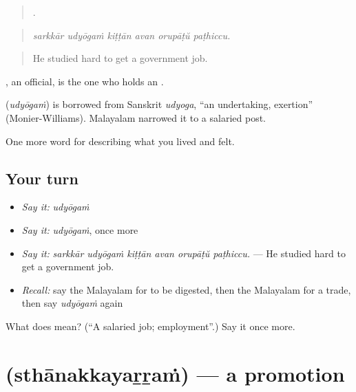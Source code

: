 \begin{quote}
     .
\end{quote}

\begin{quote}
\emph{sarkkār udyōgaṁ kiṭṭān avan orupāṭŭ paṭhiccu.}
\end{quote}

\begin{quote}
He studied hard to get a government job.
\end{quote}

, an official, is the one who holds an .

\begin{cousinweb}
\textbf{} (\emph{udyōgaṁ}) is borrowed from Sanskrit \emph{udyoga}, \textquotedblleft{}an undertaking, exertion\textquotedblright{} (Monier-Williams). Malayalam narrowed it to a salaried post.
\end{cousinweb}

\begin{grammarlens}[title={What you've built}]
One more word for describing what you lived and felt.
\end{grammarlens}

\subsection*{Your turn}
\begin{itemize}
\raggedright
  \item \emph{Say it:} \emph{udyōgaṁ}
  \item \emph{Say it:} \emph{udyōgaṁ}, once more
  \item \emph{Say it:} \emph{sarkkār udyōgaṁ kiṭṭān avan orupāṭŭ paṭhiccu.} — He studied hard to get a government job.
  \item \emph{Recall:} say the Malayalam for to be digested, then the Malayalam for a trade, then say \emph{udyōgaṁ} again
\end{itemize}

\begin{tcolorbox}[breakable,colback=teal!4,colframe=teal!35!black,title={Before you move on}]
What does  mean? (\textquotedblleft{}A salaried job; employment\textquotedblright{}.) Say it once more.
\end{tcolorbox}
\section[\texorpdfstring{\ml{സ്ഥാനക്കയറ്റം} (sthānakkayaṟṟaṁ)}{സ്ഥാനക്കയറ്റം (sthānakkayaṟṟaṁ)}]{ (sthānakkayaṟṟaṁ) — a promotion}

